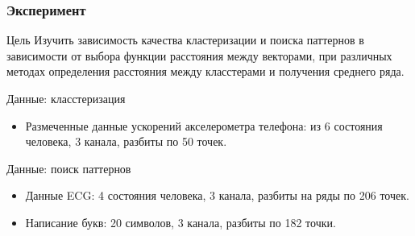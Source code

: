\documentclass{beamer}
\begin{document}
\begin{frame}
    \frametitle{Эксперимент}   
    \begin{block}{Цель}
        Изучить зависимость качества кластеризации и поиска паттернов в зависимости от выбора функции расстояния между векторами,
        при различных методах определения расстояния между класстерами и получения среднего ряда.
    \end{block}

    \begin{block}{Данные: класстеризация}
        \begin{itemize}
            \item Размеченные данные ускорений акселерометра телефона: из 6 состояния человека,
                3 канала, разбиты по 50 точек.
        \end{itemize}
    \end{block}

    \begin{block}{Данные: поиск паттернов}
        \begin{itemize}
            \item Данные ECG: 4 состояния человека, 3 канала, разбиты на ряды по 206 точек.
            \item Написание букв: 20 символов, 3 канала, разбиты по 182 точки.
        \end{itemize}
    \end{block}
\end{frame}
    
\end{document}
